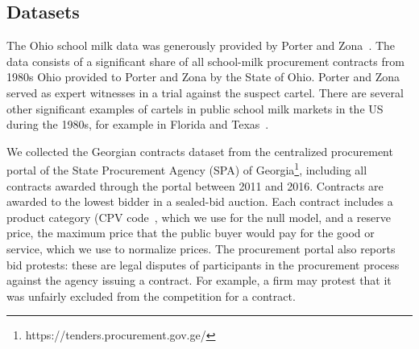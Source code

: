 \subsection{Datasets}
The Ohio school milk data was generously provided by Porter and Zona~\cite{porter1999ohio}. The data consists of a significant share of all school-milk procurement contracts from 1980s Ohio provided to Porter and Zona by the State of Ohio. Porter and Zona served as expert witnesses in a trial against the suspect cartel. There are several other significant examples of cartels in public school milk markets in the US during the 1980s, for example in Florida and Texas~\cite{pesendorfer2000,hewitt1993incumbency}.

We collected the Georgian contracts dataset from the centralized procurement portal of the State Procurement Agency (SPA) of Georgia\footnote{https://tenders.procurement.gov.ge/}, including all contracts awarded through the portal between 2011 and 2016. Contracts are awarded to the lowest bidder in a sealed-bid auction. Each contract includes a product category (CPV code~\cite{cpvreport}, which we use for the null model, and a reserve price, the maximum price that the public buyer would pay for the good or service, which we use to normalize prices. The procurement portal also reports bid protests: these are legal disputes of participants in the procurement process against the agency issuing a contract. For example, a firm may protest that it was unfairly excluded from the competition for a contract.

